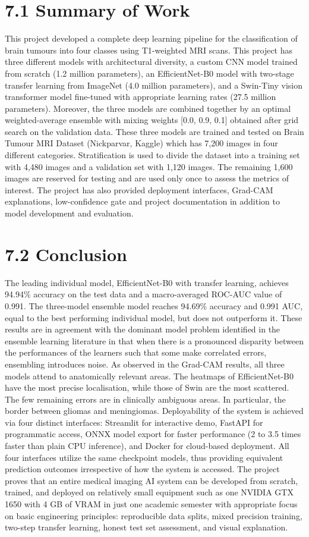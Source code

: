 \documentclass[12pt,a4paper,oneside]{report}
\begin{document}
\section{7.1 Summary of Work}
This project developed a complete deep learning pipeline for the classification of brain tumours into four classes using T1-weighted MRI scans. This project has three different models with architectural diversity, a custom CNN model trained from scratch (1.2 million parameters), an EfficientNet-B0 model with two-stage transfer learning from ImageNet (4.0 million parameters), and a Swin-Tiny vision transformer model fine-tuned with appropriate learning rates (27.5 million parameters). Moreover, the three models are combined together by an optimal weighted-average ensemble with mixing weights [0.0, 0.9, 0.1] obtained after grid search on the validation data.
These three models are trained and tested on Brain Tumour MRI Dataset (Nickparvar, Kaggle) which has 7,200 images in four different categories. Stratification is used to divide the dataset into a training set with 4,480 images and a validation set with 1,120 images. The remaining 1,600 images are reserved for testing and are used only once to assess the metrics of interest.
The project has also provided deployment interfaces, Grad-CAM explanations, low-confidence gate and project documentation in addition to model development and evaluation.
\section{7.2 Conclusion}
The leading individual model, EfficientNet-B0 with transfer learning, achieves 94.94\% accuracy on the test data and a macro-averaged ROC-AUC value of 0.991. The three-model ensemble model reaches 94.69\% accuracy and 0.991 AUC, equal to the best performing individual model, but does not outperform it. These results are in agreement with the dominant model problem identified in the ensemble learning literature in that when there is a pronounced disparity between the performances of the learners such that some make correlated errors, ensembling introduces noise.
As observed in the Grad-CAM results, all three models attend to anatomically relevant areas. The heatmaps of EfficientNet-B0 have the most precise localisation, while those of Swin are the most scattered. The few remaining errors are in clinically ambiguous areas. In particular, the border between gliomas and meningiomas.
Deployability of the system is achieved via four distinct interfaces: Streamlit for interactive demo, FastAPI for programmatic access, ONNX model export for faster performance (2 to 3.5 times faster than plain CPU inference), and Docker for cloud-based deployment. All four interfaces utilize the same checkpoint models, thus providing equivalent prediction outcomes irrespective of how the system is accessed.
The project proves that an entire medical imaging AI system can be developed from scratch, trained, and deployed on relatively small equipment such as one NVIDIA GTX 1650 with 4 GB of VRAM in just one academic semester with appropriate focus on basic engineering principles: reproducible data splits, mixed precision training, two-step transfer learning, honest test set assessment, and visual explanation.
\end{document}
